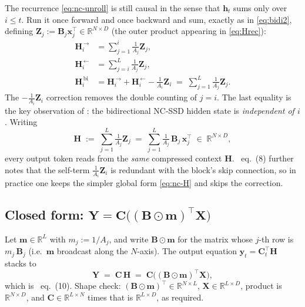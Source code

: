 \documentclass[11pt,a4paper]{article}
\begin{document}
The recurrence \eqref{eq:nc-unroll} is still causal in the sense that
$\bm{h}_t$ sums only over $i\le t$. Run it once forward and once
backward and sum, exactly as in \eqref{eq:bidi2}, defining
$\bm{Z}_j := \bm{B}_j\bm{x}_j^\top \in \mathbb{R}^{N\times D}$ (the
outer product appearing in \eqref{eq:Hrec}):
\begin{align}
  \bm{H}_i^{\,\to}        &= \sum_{j=1}^{i}\tfrac{1}{A_j}\bm{Z}_j, \\
  \bm{H}_i^{\,\leftarrow} &= \sum_{j=i}^{L}\tfrac{1}{A_j}\bm{Z}_j, \\
  \bm{H}_i^{\,\text{bi}}  &= \bm{H}_i^{\,\to} + \bm{H}_i^{\,\leftarrow} - \tfrac{1}{A_i}\bm{Z}_i
                          \;=\; \sum_{j=1}^{L}\tfrac{1}{A_j}\bm{Z}_j. \label{eq:nc-bi}
\end{align}
The $-\tfrac{1}{A_i}\bm{Z}_i$ correction removes the double counting
of $j=i$. The last equality is the key observation of
\cite{vssd}: the bidirectional NC-SSD hidden state is
\emph{independent of $i$}. Writing
\begin{equation}\label{eq:nc-H}
  \bm{H} \;:=\; \sum_{j=1}^{L}\tfrac{1}{A_j}\bm{Z}_j
       \;=\; \sum_{j=1}^{L}\tfrac{1}{A_j}\,\bm{B}_j\,\bm{x}_j^\top
       \;\in\;\mathbb{R}^{N\times D},
\end{equation}
every output token reads from the \emph{same} compressed context
$\bm{H}$. \cite{vssd}~eq.~(8) further notes that the self-term
$\tfrac{1}{A_i}\bm{Z}_i$ is redundant with the block's skip
connection, so in practice one keeps the simpler global form
\eqref{eq:nc-H} and skips the correction.

\subsection{Closed form: $\bm{Y} = \bm{C}\bigl((\bm{B}\odot\bm{m})^\top\bm{X}\bigr)$}

Let $\bm{m}\in\mathbb{R}^{L}$ with $m_j := 1/A_j$, and write $\bm{B}\odot\bm{m}$
for the matrix whose $j$-th row is $m_j\,\bm{B}_j$ (i.e.\ $\bm{m}$
broadcast along the $N$-axis). The output equation
$\bm{y}_t = \bm{C}_t^\top\bm{H}$ stacks to
\begin{equation}\label{eq:nc-Y}
  \boxed{\;\bm{Y} \;=\; \bm{C}\,\bm{H} \;=\; \bm{C}\bigl((\bm{B}\odot\bm{m})^\top\bm{X}\bigr),\;}
\end{equation}
which is \cite{vssd}~eq.~(10). Shape check:
$(\bm{B}\odot\bm{m})^\top\in\mathbb{R}^{N\times L}$, $\bm{X}\in
\mathbb{R}^{L\times D}$, product is $\mathbb{R}^{N\times D}$, and
$\bm{C}\in\mathbb{R}^{L\times N}$ times that is
$\mathbb{R}^{L\times D}$, as required.
\end{document}
